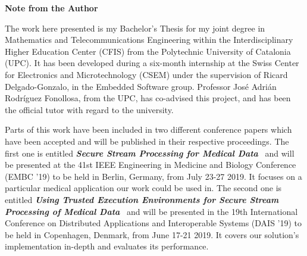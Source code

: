\vspace*{4cm}
\Huge
\textbf{Note from the Author} \label{sec:acknowledgments}
\normalsize

\vspace{1cm}

The work here presented is my Bachelor's Thesis for my joint degree in Mathematics and Telecommunications Engineering within the Interdisciplinary Higher Education Center (CFIS) from the Polytechnic University of Catalonia (UPC).
It has been developed during a six-month internship at the Swiss Center for Electronics and Microtechnology (CSEM) under the supervision of Ricard Delgado-Gonzalo, in the Embedded Software group.
Professor Jos\'e Adri\'an Rodr\'iguez Fonollosa, from the UPC, has co-advised this project, and has been the official tutor with regard to the university.

Parts of this work have been included in two different conference papers which have been accepted and will be published in their respective proceedings.
The first one is entitled \textbf{\textit{Secure Stream Processing for Medical Data}}~\cite{Segarra2019} and will be presented at the 41st IEEE Engineering in Medicine and Biology Conference (EMBC '19) to be held in Berlin, Germany, from July 23-27 2019.
It focuses on a particular medical application our work could be used in.
The second one is entitled \textbf{\textit{Using Trusted Execution Environments for Secure Stream Processing of Medical Data}}~\cite{Segarra2019b} and will be presented in the 19th International Conference on Distributed Applications and Interoperable Systems (DAIS '19) to be held in Copenhagen, Denmark, from June 17-21 2019.
It covers our solution's implementation in-depth and evaluates its performance.

%
%

\vspace*{\fill}

